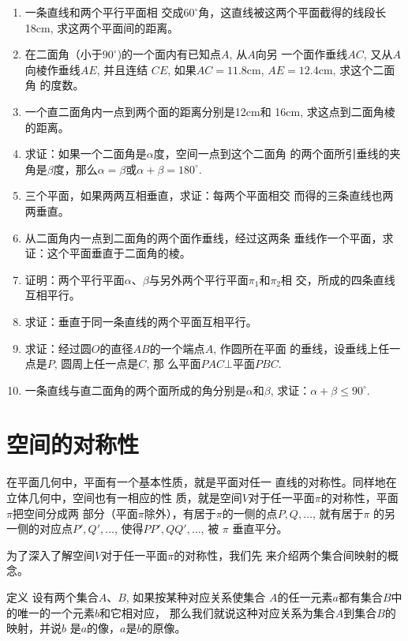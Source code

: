 \begin{enumerate}
\begin{figure}[htp]
\begin{tikzpicture}
\end{tikzpicture}
  \caption*{第12题}
\end{figure}

\item 一条直线和两个平行平面相
交成$60^{\circ}$角，这直线被这两个平面截得的线段长18cm, 
求这两个平面间的距离。
\item 在二面角（小于$90^{\circ}$)的一个面内有已知点$A$, 从$A$向另
一个面作垂线$AC$, 又从$A$向棱作垂线$AE$, 并且连结
$CE$, 如果$AC=11.8$cm, $AE=12.4$cm, 求这个二面角
的度数。
\item 一个直二面角内一点到两个面的距离分别是12cm和
16cm, 求这点到二面角棱的距离。
\item 求证：如果一个二面角是$\alpha$度，空间一点到这个二面角
的两个面所引垂线的夹角是$\beta$度，那么$\alpha=\beta$或$\alpha+\beta=180^{\circ}$.
\item 三个平面，如果两两互相垂直，求证：每两个平面相交
而得的三条直线也两两垂直。
\item 从二面角内一点到二面角的两个面作垂线，经过这两条
垂线作一个平面，求证：这个平面垂直于二面角的棱。
\item 证明：两个平行平面$\alpha$、$\beta$与另外两个平行平面$\pi_1$和$\pi_2$相
交，所成的四条直线互相平行。
\item 求证：垂直于同一条直线的两个平面互相平行。
\item 求证：经过圆$O$的直径$AB$的一个端点$A$, 作圆所在平面
的垂线，设垂线上任一点是$P$, 圆周上任一点是$C$, 那
么平面$PAC\bot $平面$PBC$.
\item 一条直线与直二面角的两个面所成的角分别是$\alpha$和$\beta$, 
求证：$\alpha+\beta\le 90^{\circ}$.
\end{enumerate}

\section{空间的对称性}
在平面几何中，平面有一个基本性质，就是平面对任一
直线的对称性。同样地在立体几何中，空间也有一相应的性
质，就是空间$V$对于任一平面$\pi$的对称性，平面$\pi$把空间分成两
部分（平面$\pi$除外），有居于$\pi$的一侧的点$P,Q,\ldots$, 就有居于$\pi$
的另一侧的对应点$P',Q',\ldots$, 使得$PP',QQ',\ldots$, 被
$\pi$
垂直平分。

为了深入了解空间$V$对于任一平面$\pi$的对称性，我们先
来介绍两个集合间映射的概念。

\begin{blk}
 {定义} 设有两个集合$A$、$B$, 如果按某种对应关系使集合
$A$的任一元素$a$都有集合$B$中的唯一的一个元素$b$和它相对应，
那么我们就说这种对应关系为集合$A$到集合$B$的映射，并说$b$
是$a$的像，$a$是$b$的原像。
\end{blk}

